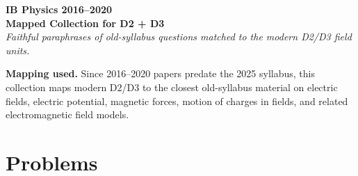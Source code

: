 \documentclass[11pt]{article}
\begin{document}
\begin{center}
{\LARGE \textbf{IB Physics 2016--2020}}\\
{\large \textbf{Mapped Collection for D2 + D3}}\\
\vspace{0.3em}
\textit{Faithful paraphrases of old-syllabus questions matched to the modern D2/D3 field units.}
\end{center}

\textbf{Mapping used.} Since 2016--2020 papers predate the 2025 syllabus, this collection maps modern D2/D3 to the closest old-syllabus material on electric fields, electric potential, magnetic forces, motion of charges in fields, and related electromagnetic field models.

\section*{Problems}
\end{document}
